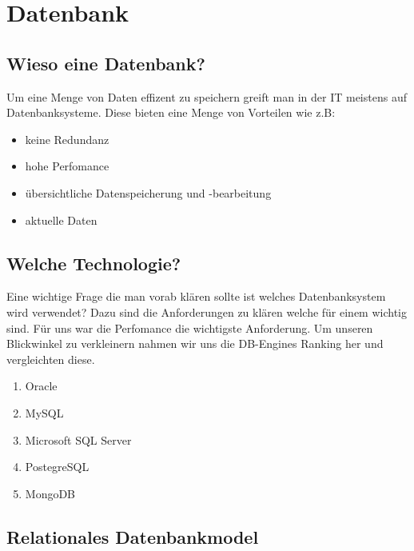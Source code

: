 \chapter{Datenbank}
\label{chap: Datenbank}

\section{Wieso eine Datenbank?}
\label{sec: VirtuellReal}

Um eine Menge von Daten effizent zu speichern greift man in der IT meistens auf Datenbanksysteme.
Diese bieten eine Menge von Vorteilen wie z.B:
\begin{itemize}
    \item keine Redundanz
    \item hohe Perfomance
    \item übersichtliche Datenspeicherung und -bearbeitung
    \item aktuelle Daten
\end{itemize}


\section{Welche Technologie?}
\label{Welche Technologie?}
Eine wichtige Frage die man vorab klären sollte ist welches Datenbanksystem wird verwendet?
Dazu sind die Anforderungen zu klären welche für einem wichtig sind. Für uns war die Perfomance die wichtigste Anforderung.
Um unseren Blickwinkel zu verkleinern nahmen wir uns die DB-Engines Ranking her und vergleichten diese.
\begin{enumerate}
    \item Oracle
    \item MySQL
    \item Microsoft SQL Server
    \item PostegreSQL
    \item MongoDB
\end{enumerate}
\section{Relationales Datenbankmodel}
\label{Relationales Datenbankmodel}
